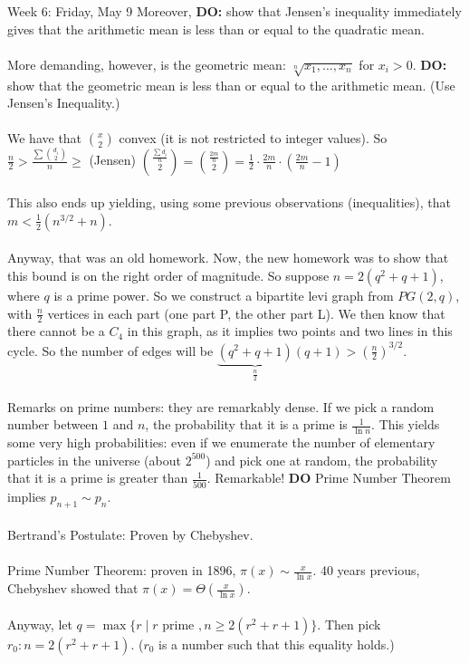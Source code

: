 \documentclass[12pt]{article}
\theoremstyle{remark}
\begin{document}
\begin{section}{Week 6: Friday, May 9}
Moreover, \textbf{DO:} show that Jensen's inequality immediately gives that the arithmetic mean is less than or equal to the quadratic mean.
\\\\
More demanding, however, is the geometric mean: $\sqrt[n]{x_1,\ldots,x_n}$ for $x_i > 0$. \textbf{DO:} show that the geometric mean is less than or equal to the arithmetic mean. (Use Jensen's Inequality.)
\\\\
We have that ${x \choose 2}$ convex (it is not restricted to integer values). So $\frac n 2 > \frac{\sum{d_i \choose 2}}{n} \geq$ (Jensen) ${\frac{\sum d_i}{n} \choose 2} = {\frac{2m}{n} \choose 2} = \frac 1 2 \cdot \frac{2m}{n} \cdot (\frac{2m}{n} -1)$
\\\\
This also ends up yielding, using some previous observations (inequalities), that $m < \frac 1 2 (n^{3/2} + n)$.
\\\\
Anyway, that was an old homework. Now, the new homework was to show that this bound is on the right order of magnitude. So suppose $n = 2(q^2+q+1)$, where $q$ is a prime power. So we construct a bipartite levi graph from $PG(2,q)$, with $\frac n 2$ vertices in each part (one part P, the other part L). We then know that there cannot be a $C_4$ in this graph, as it implies two points and two lines in this cycle. So the number of edges will be $\underbrace{(q^2+ q+1)}_{\frac n 2}(q+1) > (\frac n 2) ^{3/2}$. 
\\\\
Remarks on prime numbers: they are remarkably dense. If we pick a random number between $1$ and $n$, the probability that it is a prime is $\frac{1}{\ln n}$. This yields some very high probabilities: even if we enumerate the number of elementary particles in the universe (about $2^{500}$) and pick one at random, the probability that it is a prime is greater than $\frac 1 {500}$. Remarkable!  \textbf{DO} Prime Number Theorem implies $p_{n+1} \sim p_n$. 
\\\\
Bertrand's Postulate: Proven by Chebyshev.
\\\\
Prime Number Theorem: proven in 1896, $\pi(x) \sim \frac{x}{\ln x}$. 40 years previous, Chebyshev showed that $\pi(x) = \Theta(\frac x {\ln x})$.
\\\\
Anyway, let $q = \max\{r \mid r \text{ prime }, n \geq 2 (r^2 + r + 1)\}$. Then pick $r_0: n = 2(r^2 + r + 1)$. ($r_0$ is a number such that this equality holds.)\\\\

\end{section}
\end{document}
